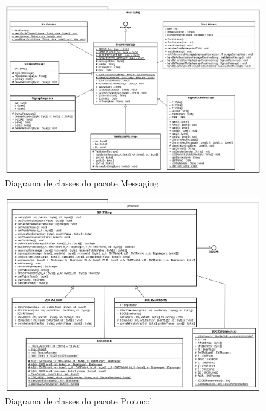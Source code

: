 \documentclass[a4paper,capchap,espacoduplo,normaltoc]{abntepusp}
\begin{document}
\begin{figure}
	\centering
		\includegraphics[width=1.00\textwidth]{figuras/ClassDiagramMessaging.png}
	\caption{Diagrama de classes do pacote Messaging}
	\label{fig:ClassDiagramMessaging}
\end{figure}

\begin{figure}
	\centering
		\includegraphics[width=1.00\textwidth]{figuras/ClassDiagramProtocol.png}
	\caption{Diagrama de classes do pacote Protocol}
	\label{fig:ClassDiagramProtocol}
\end{figure}
\end{document}
